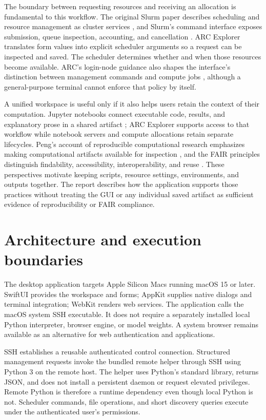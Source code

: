 \documentclass[manuscript,screen,nonacm]{acmart}
\begin{document}
The boundary between requesting resources and receiving an allocation is fundamental to this workflow. The original Slurm paper describes scheduling and resource management as cluster services \cite{slurmpaper}, and Slurm's command interface exposes submission, queue inspection, accounting, and cancellation \cite{slurm}. ARC Explorer translates form values into explicit scheduler arguments so a request can be inspected and saved. The scheduler determines whether and when those resources become available. ARC's login-node guidance also shapes the interface's distinction between management commands and compute jobs \cite{arcpolicy}, although a general-purpose terminal cannot enforce that policy by itself.

A unified workspace is useful only if it also helps users retain the context of their computation. Jupyter notebooks connect executable code, results, and explanatory prose in a shared artifact \cite{notebooks}; ARC Explorer supports access to that workflow while notebook servers and compute allocations retain separate lifecycles. Peng's account of reproducible computational research emphasizes making computational artifacts available for inspection \cite{repro}, and the FAIR principles distinguish findability, accessibility, interoperability, and reuse \cite{fair}. These perspectives motivate keeping scripts, resource settings, environments, and outputs together. The report describes how the application supports those practices without treating the GUI or any individual saved artifact as sufficient evidence of reproducibility or FAIR compliance.

\section{Architecture and execution boundaries}

The desktop application targets Apple Silicon Macs running macOS 15 or later. SwiftUI provides the workspace and forms; AppKit supplies native dialogs and terminal integration; WebKit renders web services. The application calls the macOS system SSH executable. It does not require a separately installed local Python interpreter, browser engine, or model weights. A system browser remains available as an alternative for web authentication and applications.

SSH establishes a reusable authenticated control connection. Structured management requests invoke the bundled remote helper through SSH using Python 3 on the remote host. The helper uses Python's standard library, returns JSON, and does not install a persistent daemon or request elevated privileges. Remote Python is therefore a runtime dependency even though local Python is not. Scheduler commands, file operations, and short discovery queries execute under the authenticated user's permissions.
\end{document}
